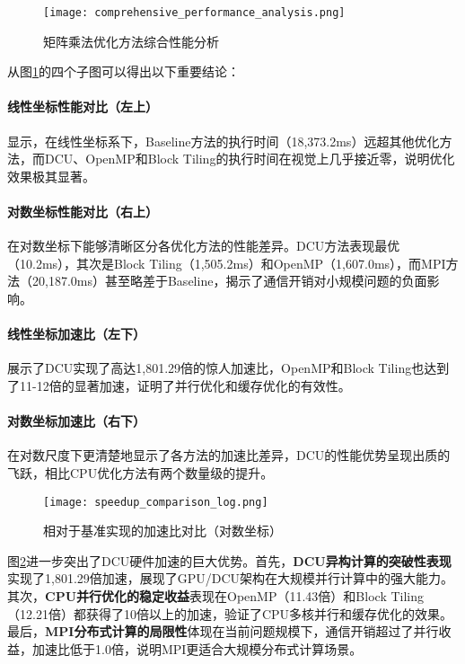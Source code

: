 \documentclass[a4paper]{article}
\begin{document}
\begin{figure}[H]
\centering
\texttt{[image: comprehensive\_performance\_analysis.png]}
\caption{矩阵乘法优化方法综合性能分析}
\label{fig:comprehensive_analysis}
\end{figure}

从图\ref{fig:comprehensive_analysis}的四个子图可以得出以下重要结论：

\paragraph{线性坐标性能对比（左上）}显示，在线性坐标系下，Baseline方法的执行时间（18,373.2ms）远超其他优化方法，而DCU、OpenMP和Block Tiling的执行时间在视觉上几乎接近零，说明优化效果极其显著。

\paragraph{对数坐标性能对比（右上）}在对数坐标下能够清晰区分各优化方法的性能差异。DCU方法表现最优（10.2ms），其次是Block Tiling（1,505.2ms）和OpenMP（1,607.0ms），而MPI方法（20,187.0ms）甚至略差于Baseline，揭示了通信开销对小规模问题的负面影响。

\paragraph{线性坐标加速比（左下）}展示了DCU实现了高达1,801.29倍的惊人加速比，OpenMP和Block Tiling也达到了11-12倍的显著加速，证明了并行优化和缓存优化的有效性。

\paragraph{对数坐标加速比（右下）}在对数尺度下更清楚地显示了各方法的加速比差异，DCU的性能优势呈现出质的飞跃，相比CPU优化方法有两个数量级的提升。

\begin{figure}[H]
\centering
\texttt{[image: speedup\_comparison\_log.png]}
\caption{相对于基准实现的加速比对比（对数坐标）}
\label{fig:speedup_comparison}
\end{figure}

图\ref{fig:speedup_comparison}进一步突出了DCU硬件加速的巨大优势。首先，\textbf{DCU异构计算的突破性表现}实现了1,801.29倍加速，展现了GPU/DCU架构在大规模并行计算中的强大能力。其次，\textbf{CPU并行优化的稳定收益}表现在OpenMP（11.43倍）和Block Tiling（12.21倍）都获得了10倍以上的加速，验证了CPU多核并行和缓存优化的效果。最后，\textbf{MPI分布式计算的局限性}体现在当前问题规模下，通信开销超过了并行收益，加速比低于1.0倍，说明MPI更适合大规模分布式计算场景。
\end{document}
